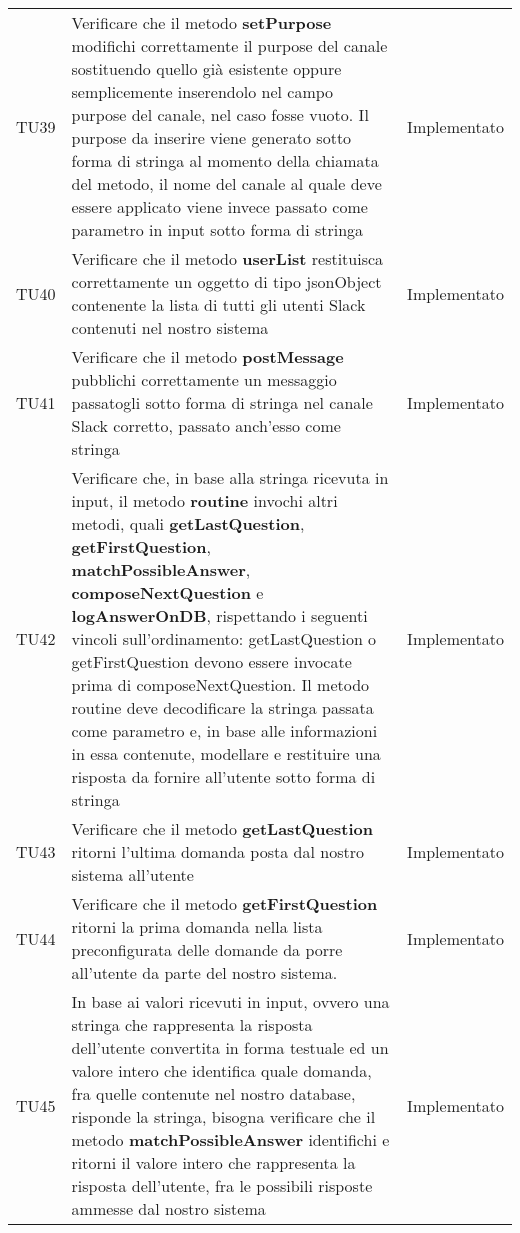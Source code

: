 \documentclass[../PianoDiQualifica_v3.0.0.tex]{subfiles}
\begin{document}
\begin{longtable}[c] { >{\centering\arraybackslash}p{2cm} p{9cm} >{\centering\arraybackslash}p{4cm}}
			\addlinespace[0.3em]
			\midrule
			\addlinespace[0.3em]
			TU39 & Verificare che il metodo \textbf{setPurpose} modifichi correttamente il purpose del canale sostituendo quello già esistente oppure semplicemente inserendolo nel campo purpose del canale, nel caso fosse vuoto. Il purpose da inserire viene generato sotto forma di stringa al momento della chiamata del metodo, il nome del canale al quale deve essere applicato viene invece passato come parametro in input sotto forma di stringa & Implementato \\
			\addlinespace[0.3em]
			\midrule
			\addlinespace[0.3em]
			TU40 & Verificare che il metodo \textbf{userList} restituisca correttamente un oggetto di tipo jsonObject contenente la lista di tutti gli utenti Slack contenuti nel nostro sistema & Implementato \\
			\addlinespace[0.3em]
			\midrule
			\addlinespace[0.3em]
			TU41 & Verificare che il metodo \textbf{postMessage} pubblichi correttamente un messaggio passatogli sotto forma di stringa nel canale Slack corretto, passato anch'esso come stringa & Implementato \\
			\addlinespace[0.3em]
			\midrule
			\addlinespace[0.3em]
			TU42 & Verificare che, in base alla stringa ricevuta in input, il metodo \textbf{routine} invochi altri metodi, quali \textbf{getLastQuestion}, \textbf{getFirstQuestion}, \textbf{matchPossibleAnswer}, \textbf{composeNextQuestion} e \textbf{logAnswerOnDB}, rispettando i seguenti vincoli sull'ordinamento: getLastQuestion o getFirstQuestion devono essere invocate prima di composeNextQuestion. Il metodo routine deve decodificare la stringa passata come parametro e, in base alle informazioni in essa contenute, modellare e restituire una risposta da fornire all'utente sotto forma di stringa & Implementato \\
			\addlinespace[0.3em]
			\midrule
			\addlinespace[0.3em]
			TU43 & Verificare che il metodo \textbf{getLastQuestion} ritorni l'ultima domanda posta dal nostro sistema all'utente & Implementato \\
			\addlinespace[0.3em]
			\midrule
			\addlinespace[0.3em]
			TU44 & Verificare che il metodo \textbf{getFirstQuestion} ritorni la prima domanda nella lista preconfigurata delle domande da porre all'utente da parte del nostro sistema. & Implementato \\
			\addlinespace[0.3em]
			\midrule
			\addlinespace[0.3em]
			TU45 & In base ai valori ricevuti in input, ovvero una stringa che rappresenta la risposta dell'utente convertita in forma testuale ed un valore intero che identifica quale domanda, fra quelle contenute nel nostro database, risponde la stringa, bisogna verificare che il metodo \textbf{matchPossibleAnswer} identifichi e ritorni il valore intero che rappresenta la risposta dell'utente, fra le possibili risposte ammesse dal nostro sistema & Implementato \\

\end{longtable}
\end{document}
